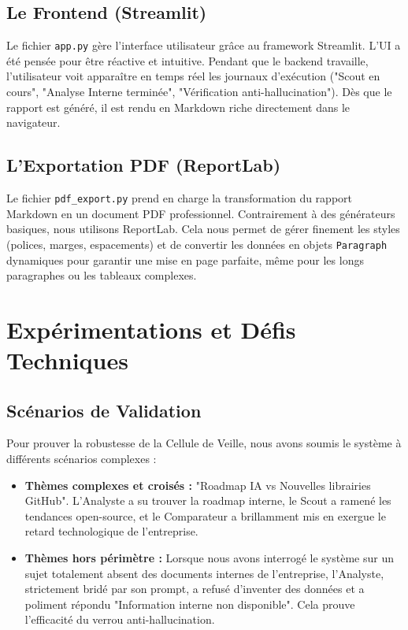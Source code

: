 \documentclass[12pt,a4paper]{report}
\begin{document}
\section{Le Frontend (Streamlit)}
Le fichier \texttt{app.py} gère l'interface utilisateur grâce au framework Streamlit. L'UI a été pensée pour être réactive et intuitive. Pendant que le backend travaille, l'utilisateur voit apparaître en temps réel les journaux d'exécution ("Scout en cours", "Analyse Interne terminée", "Vérification anti-hallucination"). Dès que le rapport est généré, il est rendu en Markdown riche directement dans le navigateur.

\section{L'Exportation PDF (ReportLab)}
Le fichier \texttt{pdf\_export.py} prend en charge la transformation du rapport Markdown en un document PDF professionnel. Contrairement à des générateurs basiques, nous utilisons ReportLab. Cela nous permet de gérer finement les styles (polices, marges, espacements) et de convertir les données en objets \texttt{Paragraph} dynamiques pour garantir une mise en page parfaite, même pour les longs paragraphes ou les tableaux complexes.

\chapter{Expérimentations et Défis Techniques}

\section{Scénarios de Validation}
Pour prouver la robustesse de la Cellule de Veille, nous avons soumis le système à différents scénarios complexes :
\begin{itemize}
    \item \textbf{Thèmes complexes et croisés :} "Roadmap IA vs Nouvelles librairies GitHub". L'Analyste a su trouver la roadmap interne, le Scout a ramené les tendances open-source, et le Comparateur a brillamment mis en exergue le retard technologique de l'entreprise.
    \item \textbf{Thèmes hors périmètre :} Lorsque nous avons interrogé le système sur un sujet totalement absent des documents internes de l'entreprise, l'Analyste, strictement bridé par son prompt, a refusé d'inventer des données et a poliment répondu "Information interne non disponible". Cela prouve l'efficacité du verrou anti-hallucination.
\end{itemize}
\end{document}
